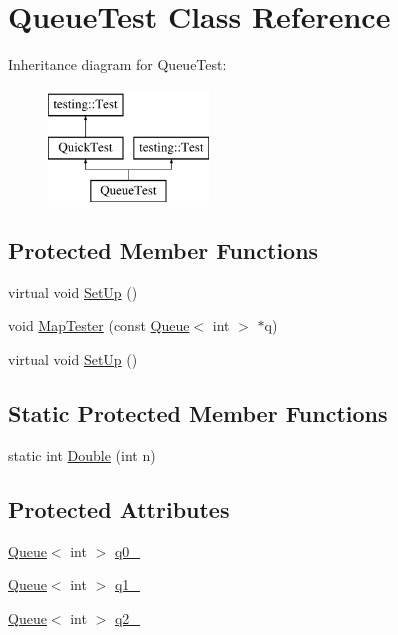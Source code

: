 \hypertarget{class_queue_test}{\section{Queue\-Test Class Reference}
\label{class_queue_test}
}
Inheritance diagram for Queue\-Test\-:\begin{figure}[H]
\begin{center}
\leavevmode
\includegraphics[height=3.000000cm]{class_queue_test}
\end{center}
\end{figure}
\subsection*{Protected Member Functions}
\begin{DoxyCompactItemize}
\item 
virtual void \hyperlink{class_queue_test_a91e69958f086239a523864d6b94ab174}{Set\-Up} ()
\item 
void \hyperlink{class_queue_test_a7f1661cd16c428a130d6ac1e4246eaab}{Map\-Tester} (const \hyperlink{class_queue}{Queue}$<$ int $>$ $\ast$q)
\item 
virtual void \hyperlink{class_queue_test_a91e69958f086239a523864d6b94ab174}{Set\-Up} ()
\end{DoxyCompactItemize}
\subsection*{Static Protected Member Functions}
\begin{DoxyCompactItemize}
\item 
static int \hyperlink{class_queue_test_a2c7e0d1edb558dbbc4c085316d3d1ee6}{Double} (int n)
\end{DoxyCompactItemize}
\subsection*{Protected Attributes}
\begin{DoxyCompactItemize}
\item 
\hyperlink{class_queue}{Queue}$<$ int $>$ \hyperlink{class_queue_test_a0eba1fe2b31d75abd2df688ca5245e22}{q0\-\_\-}
\item 
\hyperlink{class_queue}{Queue}$<$ int $>$ \hyperlink{class_queue_test_a1e55594e71820ba0f1b09591fb328c30}{q1\-\_\-}
\item 
\hyperlink{class_queue}{Queue}$<$ int $>$ \hyperlink{class_queue_test_aeb7a2e3f6ce2d97d84eb1e01468adc2f}{q2\-\_\-}
\end{DoxyCompactItemize}
